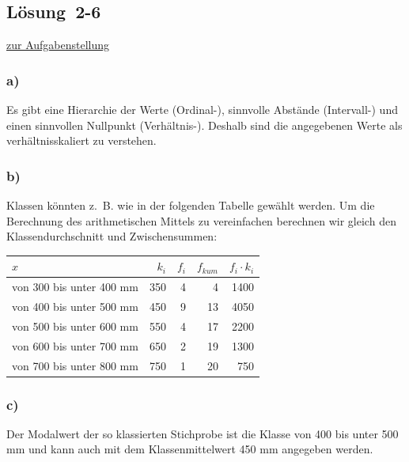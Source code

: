 \documentclass[
  11pt,
  ngerman,
  a4paper,
]{report}
\begin{document}
\hypertarget{loesung-2-6}{%
\subsection{Lösung~2-6}\label{loesung-2-6}}

\protect\hyperlink{aufgabe-2-6}{zur Aufgabenstellung}

\hypertarget{a-7}{%
\subsubsection{a)}\label{a-7}}

Es gibt eine Hierarchie der Werte (Ordinal-), sinnvolle Abstände (Intervall-) und einen sinnvollen Nullpunkt (Verhältnis-). Deshalb sind die angegebenen Werte als verhältnisskaliert zu verstehen.

\hypertarget{b-7}{%
\subsubsection{b)}\label{b-7}}

Klassen könnten z.~B. wie in der folgenden Tabelle gewählt werden. Um die Berechnung des arithmetischen Mittels zu vereinfachen berechnen wir gleich den Klassendurchschnitt und Zwischensummen:

\begin{table}[H]
\centering
\begin{tabular}{lrrrr}
\toprule
$x$ & $k_i$ & $f_i$ & $f_{kum}$ & $f_i \cdot k_i$\\
\midrule
von 300 bis unter 400 mm & 350 & 4 & 4 & 1400\\
von 400 bis unter 500 mm & 450 & 9 & 13 & 4050\\
von 500 bis unter 600 mm & 550 & 4 & 17 & 2200\\
von 600 bis unter 700 mm & 650 & 2 & 19 & 1300\\
von 700 bis unter 800 mm & 750 & 1 & 20 & 750\\
\bottomrule
\end{tabular}
\end{table}

\hypertarget{c-6}{%
\subsubsection{c)}\label{c-6}}

Der Modalwert der so klassierten Stichprobe ist die Klasse von 400 bis unter 500 mm und kann auch mit dem Klassenmittelwert 450 mm angegeben werden.
\end{document}

